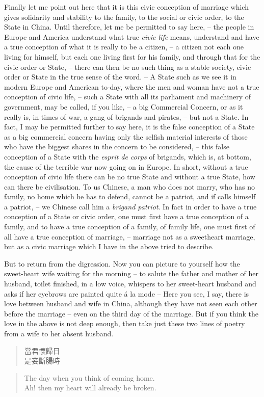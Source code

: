 Finally let me point out here that it is this civic conception of marriage
which gives solidarity and stability to the family,
to the social or civic order, to the State in China. Until therefore,
let me be permitted to say here,
--  the people in Europe and America understand what true \emph{civic life} means,
understand and have a true conception of what it is really to be a citizen,
--  a citizen not each one living for himself, but each one living first for his family, and through that for the civic order or State,
-- there can then be no such thing as a stable society, civic order or State in the true sense of the word.
-- A State such as we see it in modern Europe and American to-day, where the men and woman have not a true conception of civic life,
-- such a State with all its parliament and machinery of government,
may be called, if you like,
-- a big Commercial Concern, or as it really is, in times of war, a gang of brigands and pirates,
-- but not a State. In fact, I may be permitted further to say here,
it is the false conception of a State as a big commercial concern having only the selfish material interests of those who have the biggest shares in the concern to be considered,
-- this false conception of a State with the \emph{esprit de corps} of brigands,
which is, at bottom, the cause of the terrible war now going on in Europe.
In short, without a true conception of civic life there can be no true State and without a true State, how can there be civilisation.
To us Chinese, a man who does not marry, who has no family,
no home which he has to defend, cannot be a patriot, and if calls himself a patriot,
-- we Chinese call him a \emph{brigand patriot}.
In fact in order to have a true conception of a State or civic order,
one must first have a true conception of a family,
and to have a true conception of a family, of family life, one must first of all have a true conception of marriage,
-- marriage not as a sweetheart marriage,
but as a civic marriage which I have in the above tried to describe.

But to return from the digression.
Now you can picture to yourself how the sweet-heart wife waiting for the morning
-- to salute the father and mother of her husband, toilet finished,
in a low voice, whispers to her sweet-heart husband and asks if her eyebrows are painted quite \'a la mode
-- Here you see, I say, there is love between husband and wife in China,
although they have not seen each other before the marriage
-- even on the third day of the marriage.
But if you think the love in the above is not deep enough,
then take just these two lines of poetry from a wife to her absent husband.
\begin{quote}
當君懷歸日 \\
是妾斷腸時
\end{quote}
\begin{quote}
The day when you think of coming home. \\
Ah! then my heart will already be broken.
\end{quote}

